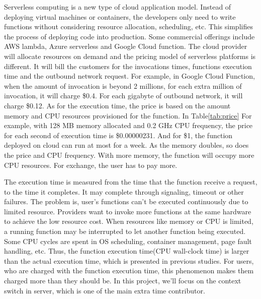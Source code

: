 


Serverless computing is a new type of cloud application model.
Instead of deploying virtual machines or containers, the developers only need to write functions without considering resource allocation, scheduling, etc. 
This simplifies the process of deploying code into production. 
Some commercial offerings include AWS lambda, Azure serverless and Google Cloud function. 
The cloud provider will allocate resources on demand and the pricing model of serverless platforms is different. 
It will bill the customers for the invocations times, functions execution time and the outbound network request. 
For example, in Google Cloud Function, when the amount of invocation is beyond 2 millions, 
for each extra million of invocation, it will charge \$0.4. 
For each gigabyte of outbound network, it will charge \$0.12. 
As for the execution time, the price is based on the amount memory and CPU resources provisioned for the function.
In Table\ref{tab:price} For example, with 128 MB memory allocated and 0.2 GHz CPU frequency, the price for each second of execution time is \$0.00000231. 
And for \$1, the function deployed on cloud can run at most for a week.
As the memory doubles, so does the price and CPU frequency. 
With more memory, the function will occupy more CPU resources. 
For exchange, the user has to pay more.

The execution time is measured from the time that the function receive a request, to the time it completes. 
It may complete through signaling, timeout or other failures. 
The problem is, user's functions can't be executed continuously due to limited resource. 
Providers want to invoke more functions at the same hardware to achieve the low resource cost. 
When resources like memory or CPU is limited, a running function may be interrupted to let another function being executed.
Some CPU cycles are spent in OS scheduling, container management, page fault handling, etc.
Thus, the function execution time(CPU wall-clock time) is larger than the actual execution time, which is presented in previous studies.\cite{serverless-main}
For users, who are charged with the function execution time, this phenomenon makes them charged more than they should be.
In this project, we'll focus on the context switch in server, which is one of the main extra time contributor\cite{serverless-main}.

